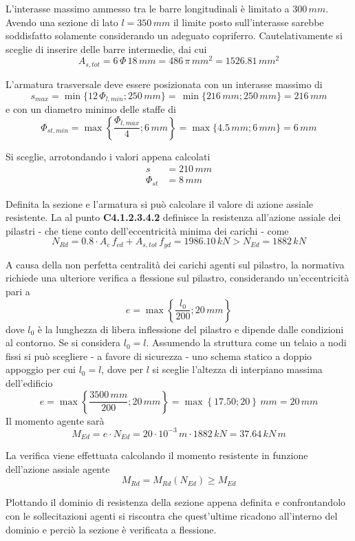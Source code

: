 L'interasse massimo ammesso tra le barre longitudinali è limitato a $300\,mm$. Avendo una sezione di lato $l = 350\,mm$ il limite posto sull'interasse sarebbe soddisfatto solamente considerando un adeguato copriferro. Cautelativamente si sceglie di inserire delle barre intermedie, dai cui
\[
A_{s,tot} = 6\,\Phi\,18\,mm = 486\,\pi\,mm^2 = 1526.81\,mm^2
\]

L'armatura trasversale deve essere posizionata con un interasse massimo di
\[
s_{max} = \min\{12\,\Phi_{l,min}; 250\,mm\} = \,\min\{216\,mm; 250\,mm\} = 216\,mm
\]
e con un diametro minimo delle staffe di
\[
\Phi_{st,min} = \max\left\{\dfrac{\Phi_{l,max}}{4}; 6\,mm\right\} = \max\{4.5\,mm; 6\,mm\} = 6\,mm
\]

Si sceglie, arrotondando i valori appena calcolati
\begin{align}
	\label{eq:s_pilastro}
	s &= 210\,mm\\
	\label{eq:Phi_st_pilastro}
	\Phi_{st} &= 8\,mm
\end{align}

Definita la sezione e l'armatura si può calcolare il valore di azione assiale resistente. La \circolare al punto \textbf{C4.1.2.3.4.2} definisce la resistenza all'azione assiale dei pilastri - che tiene conto dell'eccentricità minima dei carichi - come
\begin{equation}
    \label{eq:NRd}
	N_{Rd} = 0.8\cdot A_c\,f_{cd} + A_{s,tot}\,f_{yd} = 1986.10\,kN > N_{Ed} = 1882\,kN
\end{equation}

A causa della non perfetta centralità dei carichi agenti sul pilastro, la normativa richiede una ulteriore verifica a flessione sul pilastro, considerando un'eccentricità pari a 
\[
e = \max\left\{\dfrac{l_0}{200}; 20\,mm\right\}
\]
dove $l_0$ è la lunghezza di libera inflessione del pilastro e dipende dalle condizioni al contorno. Se si considera  $l_0 = l$. Assumendo la struttura come un telaio a nodi fissi si può scegliere - a favore di sicurezza - uno schema statico a doppio appoggio per cui $l_0 = l$, dove per $l$ si sceglie l'altezza di interpiano massima  dell'edificio
\[
e = \max\left\{\dfrac{3500\,mm}{200}; 20\,mm\right\} =\max\left\{17.50; 20\right\}\,mm = 20\,mm
\]
Il momento agente sarà
\[
M_{Ed} = e\cdot N_{Ed} = 20\cdot 10^{-3}\,m \cdot 1882\,kN = 37.64\,kN\,m
\]

La verifica viene effettuata calcolando il momento resistente in funzione dell'azione assiale agente
\[
M_{Rd} = M_{Rd}(N_{Ed}) \geq M_{Ed}
\]

Plottando il dominio di resistenza della sezione appena definita e confrontandolo con le sollecitazioni agenti si riscontra che quest'ultime ricadono all'interno del dominio e perciò la sezione è verificata a flessione. 

